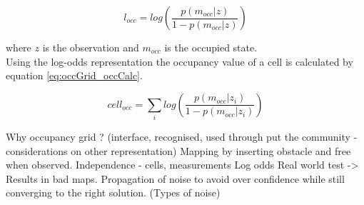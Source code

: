\begin{equation}
\label{eq:log-odds}
l_{occ} =  log(\frac{p(m_{occ}|z)}{1-p(m_{occ}|z)} )
\end{equation}

where \(z\) is the observation and \(m_{occ}\) is the occupied state. 
\\
Using the log-odds representation the occupancy value of a cell is calculated by equation \ref{eq:occGrid_occCalc}. 

\begin{equation}
\label{eq:occGrid_occCalc}
cell_{occ} = \sum_{i} log(\frac{p(m_{occ}|z_i)}{1-p(m_{occ}|z_i)} )
\end{equation}



Why occupancy grid ? (interface, recognised, used through put the community - considerations on other representation)
Mapping by inserting obstacle and free when observed.
Independence - cells, measurements
Log odds
Real world test -> Results in bad maps.
Propagation of noise to avoid over confidence while still converging to the right solution. (Types of noise)

